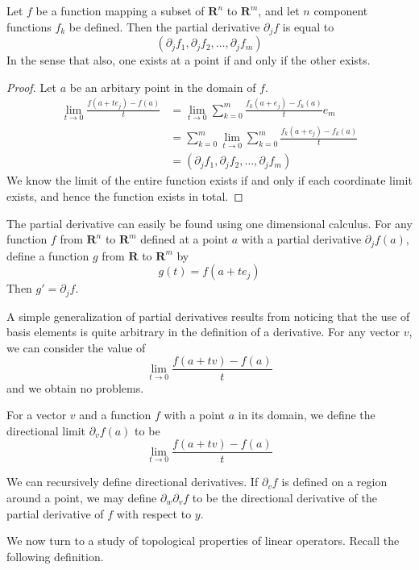 \begin{theorem}
  Let $f$ be a function mapping a subset of $\mathbf{R}^n$ to $\mathbf{R}^m$, and let $n$ component functions $f_k$ be defined. Then the partial derivative $\partial_j f$ is equal to
  \[ (\partial_j f_1, \partial_j f_2, \dots, \partial_j f_m) \]
  In the sense that also, one exists at a point if and only if the other exists.
\end{theorem}
\begin{proof}
  Let $a$ be an arbitary point in the domain of $f$.
  \begin{align*}
    \lim_{t \to 0} \frac{f(a + te_j) - f(a)}{t} &= \lim_{t \to 0} \sum_{k = 0}^m \frac{f_k(a + e_j) - f_k(a)}{t}e_m\\
    &= \sum_{k = 0}^m \lim_{t \to 0} \sum_{k = 0}^m \frac{f_k(a + e_j) - f_k(a)}{t}\\
    &= (\partial_j f_1, \partial_j f_2, \dots, \partial_j f_m)
  \end{align*}
  We know the limit of the entire function exists if and only if each coordinate limit exists, and hence the function exists in total.
\end{proof}

The partial derivative can easily be found using one dimensional calculus. For any function $f$ from $\mathbf{R}^n$ to $\mathbf{R}^m$ defined at a point $a$ with a partial derivative $\partial_j f(a)$, define a function $g$ from $\mathbf{R}$ to $\mathbf{R}^m$ by
%
\[ g(t) = f(a + te_j) \]
%
Then $g' = \partial_j f$.

A simple generalization of partial derivatives results from noticing that the use of basis elements is quite arbitrary in the definition of a derivative. For any vector $v$, we can consider the value of
%
\[ \lim_{t \to 0} \frac{f(a + tv) - f(a)}{t} \]
%
and we obtain no problems.

\begin{definition}
  For a vector $v$ and a function $f$ with a point $a$ in its domain, we define the directional limit $\partial_v f(a)$ to be
  \[ \lim_{t \to 0} \frac{f(a + tv) - f(a)}{t} \]
\end{definition}

We can recursively define directional derivatives. If $\partial_v f$ is defined on a region around a point, we may define $\partial_w \partial_v f$ to be the directional derivative of the partial derivative of $f$ with respect to $y$.

We now turn to a study of topological properties of linear operators. Recall the following definition.

